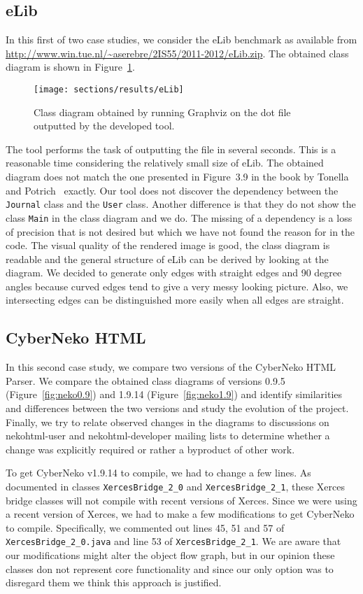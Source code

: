 \subsection{eLib}
In this first of two case studies, we consider the eLib benchmark as available from \url{http://www.win.tue.nl/~aserebre/2IS55/2011-2012/eLib.zip}.
The obtained class diagram is shown in Figure~\ref{fig:eLib}.
\begin{figure}[H]
\center
\texttt{[image: sections/results/eLib]}
\caption{Class diagram obtained by running Graphviz on the dot file outputted by the developed tool.}
\label{fig:eLib}
\end{figure}
The tool performs the task of outputting the file in several seconds. 
This is a reasonable time considering the relatively small size of eLib. 
The obtained diagram does not match the one presented in Figure~3.9 in the book by Tonella and Potrich~\cite{rev-eng} exactly. 
Our tool does not discover the dependency between the \texttt{Journal} class and the \texttt{User} class. 
Another difference is that they do not show the class \texttt{Main} in the class diagram and we do.
The missing of a dependency is a loss of precision that is not desired but which we have not found the reason for in the code.
The visual quality of the rendered image is good, the class diagram is readable and the general structure of eLib can be derived by looking at the diagram. 
We decided to generate only edges with straight edges and 90 degree angles because curved edges tend to give a very messy looking picture.
Also, we intersecting edges can be distinguished more easily when all edges are straight.

\subsection{CyberNeko HTML}
In this second case study, we compare two versions of the CyberNeko HTML Parser. 
We compare the obtained class diagrams of versions 0.9.5 (Figure~\ref{fig:neko0.9}) and 1.9.14 (Figure~\ref{fig:neko1.9}) and identify similarities and differences between the two versions and study the evolution of the project.
Finally, we try to relate observed changes in the diagrams to discussions on nekohtml-user and nekohtml-developer mailing lists to determine whether a change was explicitly required or rather a byproduct of other work.

To get CyberNeko v1.9.14 to compile, we had to change a few lines.
As documented in classes \texttt{XercesBridge_2_0} and \texttt{XercesBridge_2_1}, these Xerces bridge classes will not compile with recent versions of Xerces.
Since we were using a recent version of Xerces, we had to make a few modifications to get CyberNeko to compile.
Specifically, we commented out lines 45, 51 and 57 of \texttt{XercesBridge_2_0.java} and line 53 of \texttt{XercesBridge_2_1}.
We are aware that our modifications might alter the object flow graph, but in our opinion these classes don not represent core functionality and since our only option was to disregard them we think this approach is justified.

